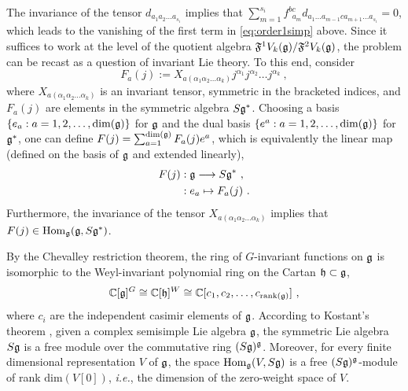 The invariance of the tensor $d_{a_1 a_2 \ldots a_{s_i}}$ implies that $\sum_{m=1}^{s_i} f^{b c}_{\ \ a_{m}} d_{a_1 \ldots a_{m-1} c a_{m+1} \ldots a_{s_i}} = 0$, which leads to the vanishing of the first term in \eqref{eq:order1simp} above. Since it suffices to work at the level of the quotient algebra $\mathfrak{F}^1V_k(\mathfrak{g})/\mathfrak{F}^2V_k(\mathfrak{g})$, the problem can be recast as a question of invariant Lie theory. To this end, consider  
\begin{equation} \label{eq:F_adefn}
    F_a(j) := X_{a(\alpha_1 \alpha_2 \ldots \alpha_k)} j^{\alpha_1} j^{\alpha_2} \ldots j^{\alpha_k}~,
\end{equation}
where $X_{a(\alpha_1 \alpha_2 \ldots \alpha_k)}$ is an invariant tensor, symmetric in the bracketed indices, and $F_a(j)$ are elements in the symmetric algebra $S\mathfrak{g}^*$. Choosing a basis $\{e_a : a = 1,2,\ldots, \mathrm{dim}(\mathfrak{g}) \}$ for $\mathfrak{g}$ and the dual basis $\{e^a : a = 1,2,\ldots, \mathrm{dim}(\mathfrak{g}) \}$ for $\mathfrak{g}^*$, one can define $F(j) = \sum_{a=1}^{\mathrm{dim}(\mathfrak{g})} F_a(j) e^a$, which is equivalently the linear map (defined on the basis of $\mathfrak{g}$ and extended linearly),
\begin{equation} 
\begin{split}
    F(j) &: \mathfrak{g} \longrightarrow S\mathfrak{g}^*~, \\
    &: e_a \mapsto F_a(j)~.  
\end{split}
\end{equation}
Furthermore, the invariance of the tensor $X_{a(\alpha_1 \alpha_2 \ldots \alpha_k)}$ implies that $F(j) \in \mathrm{Hom}_{\mathfrak{g}}(\mathfrak{g}, S\mathfrak{g}^*)$. 

By the Chevalley restriction theorem, the ring of $G$-invariant functions on $\mathfrak{g}$ is isomorphic to the Weyl-invariant polynomial ring on the Cartan $\mathfrak{h} \subset \mathfrak{g}$,
\begin{equation} \label{eq:Chevalley}
    \mathbb{C}[\mathfrak{g}]^G \cong \mathbb{C}[\mathfrak{h}]^W \cong \mathbb{C}[c_1,c_2,\ldots, c_{\mathrm{rank}(\mathfrak{g})}]~,
\end{equation}
where $c_i$ are the independent casimir elements of $\mathfrak{g}$. According to Kostant's theorem \cite{Kostant:1963}, given a complex semisimple Lie algebra $\mathfrak{g}$, the symmetric Lie algebra $S\mathfrak{g}$ is a free module over the commutative ring $(S\mathfrak{g})^{\mathfrak{g}}$. Moreover, for every finite dimensional representation $V$ of $\mathfrak{g}$, the space $\mathrm{Hom}_{\mathfrak{g}}(V, S \mathfrak{g})$ is a free $(S\mathfrak{g})^{\mathfrak{g}}$-module of rank $\mathrm{dim}(V[0])$, \emph{i.e.}, the dimension of the zero-weight space of $V$. 


